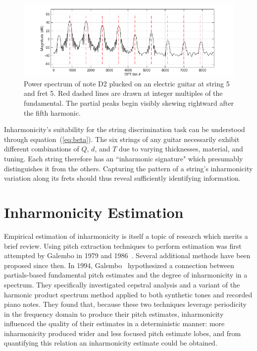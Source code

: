 \documentclass[12pt]{cmuthesis}
\begin{document}
\begin{figure}[!htbp]
\centering
\includegraphics[scale=0.65]{skew}
\caption{Power spectrum of note D2 plucked on an electric guitar at string 5 and fret 5. Red dashed lines are drawn at integer multiples of the fundamental. The partial peaks begin visibly skewing rightward after the fifth harmonic.}
\label{fig:skew}
\end{figure}

Inharmonicity's suitability for the string discrimination task can be understood through equation~(\ref{eq:beta}). The six strings of any guitar necessarily exhibit different combinations of $Q$, $d$, and $T$ due to varying thicknesses, material, and tuning. Each string therefore has an ``inharmonic signature" which presumably distinguishes it from the others. Capturing the pattern of a string's inharmonicity variation along its frets should thus reveal sufficiently identifying information.

\section{Inharmonicity Estimation}
\label{lit-beta-est}
Empirical estimation of inharmonicity is itself a topic of research which merits a brief review. Using pitch extraction techniques to perform estimation was first attempted by Galembo in 1979 and 1986~\cite{galembo1979,galembo1987}. Several additional methods have been proposed since then. In 1994, Galembo~\cite{galembo1994} hypothesized a connection between partials-based fundamental pitch estimates and the degree of inharmonicity in a spectrum. They specifically investigated cepstral analysis and a variant of the harmonic product spectrum method applied to both synthetic tones and recorded piano notes. They found that, because these two techniques leverage periodicity in the frequency domain to produce their pitch estimates, inharmonicity influenced the quality of their estimates in a deterministic manner: more inharmonicity produced wider and less focused pitch estimate lobes, and from quantifying this relation an inharmonicity estimate could be obtained.
 
\end{document}
